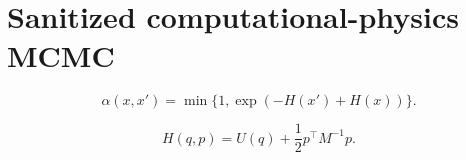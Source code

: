 \section{Sanitized computational-physics MCMC}

\begin{equation}\label{eq:dept-acceptance-ratio}
\alpha(x,x') = \min\{1,\exp(-H(x')+H(x))\}.
\end{equation}

\begin{equation}\label{eq:dept-hamiltonian-flow}
H(q,p)=U(q)+\frac{1}{2}p^\top M^{-1}p.
\end{equation}
